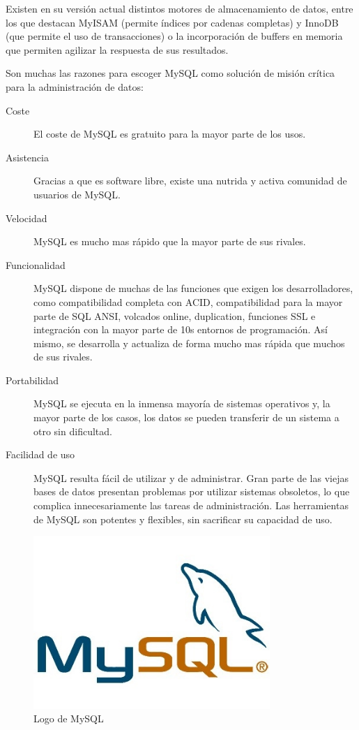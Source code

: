 Existen en su versión actual distintos motores de almacenamiento de datos, entre los que destacan MyISAM (permite índices por cadenas completas) y InnoDB (que permite el uso de transacciones) o la incorporación de buffers en memoria que permiten agilizar la respuesta de sus resultados. 

Son muchas las razones para escoger MySQL como solución de misión crítica
para la administración de datos:

\begin{description}
    \item[Coste] El coste de MySQL es gratuito para la mayor parte de los usos.
    \item[Asistencia] Gracias a que es software libre, existe una nutrida y activa comunidad de usuarios de MySQL.
    \item[Velocidad]  MySQL es mucho mas rápido que la mayor parte de sus rivales.
    \item[Funcionalidad] MySQL dispone de muchas de las funciones que exigen los desarrolladores, como compatibilidad completa con ACID,  compatibilidad para la mayor parte de SQL ANSI, volcados online, duplication, funciones SSL e integración con la mayor parte de 10s entornos de programación. Así mismo, se desarrolla y actualiza de forma mucho mas rápida que muchos de sus rivales.
    \item[Portabilidad] MySQL se ejecuta en la inmensa mayoría de sistemas operativos y, la mayor parte de los casos, los datos se pueden transferir de un sistema a otro sin dificultad.
    \item[Facilidad de uso] MySQL resulta fácil de utilizar y de administrar. Gran parte de las viejas bases de datos presentan problemas por utilizar sistemas obsoletos, lo que complica innecesariamente las tareas de administración. Las herramientas de MySQL son potentes y flexibles, sin sacrificar su capacidad de uso.
\end{description}

\begin{figure}[ht]
    \centering
    \includegraphics[width=0.8\textwidth]{imagenes/logo-mysql.jpg}
    \caption{Logo de MySQL}
    \label{fig:logomysql}
\end{figure}

